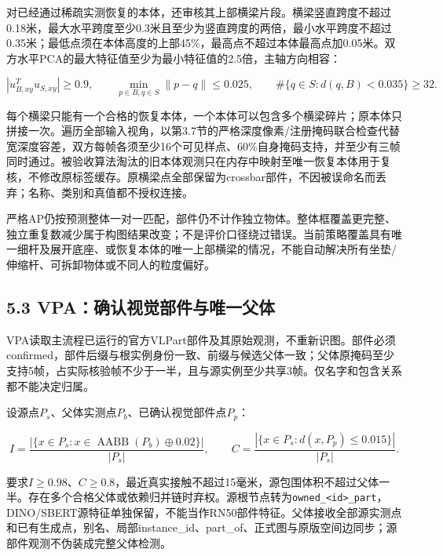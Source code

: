 \documentclass[UTF8,fontset=fandol]{ctexart}
\begin{document}
对已经通过稀疏实测恢复的本体，还审核其上部横梁片段。横梁竖直跨度不超过0.18米，最大水平跨度至少0.3米且至少为竖直跨度的两倍，最小水平跨度不超过0.35米；最低点须在本体高度的上部45\%，最高点不超过本体最高点加0.05米。双方水平PCA的最大特征值至少为最小特征值的2.5倍，主轴方向相容：



\[
|u_{B,xy}^{T}u_{S,xy}|\ge0.9,\qquad
\min_{p\in B,q\in S}\|p-q\|\le0.025,\qquad
\#\{q\in S:d(q,B)<0.035\}\ge32.
\]

每个横梁只能有一个合格的恢复本体，一个本体可以包含多个横梁碎片；原本体只拼接一次。遍历全部输入视角，以第3.7节的严格深度像素/注册掩码联合检查代替宽深度容差，双方每帧各须至少16个可见样点、60\%自身掩码支持，并至少有三帧同时通过。被验收算法淘汰的旧本体观测只在内存中映射至唯一恢复本体用于复核，不修改原标签缓存。原横梁点全部保留为crossbar部件，不因被误命名而丢弃；名称、类别和真值都不授权连接。



严格AP仍按预测整体一对一匹配，部件仍不计作独立物体。整体框覆盖更完整、独立重复数减少属于构图结果改变；不是评价口径绕过错误。当前策略覆盖具有唯一细杆及展开底座、或恢复本体的唯一上部横梁的情况，不能自动解决所有坐垫/伸缩杆、可拆卸物体或不同人的粒度偏好。



\subsection*{5.3 VPA：确认视觉部件与唯一父体}

VPA读取主流程已运行的官方VLPart部件及其原始观测，不重新识图。部件必须confirmed，部件后缀与根实例身份一致、前缀与候选父体一致；父体原掩码至少支持5帧，占实际核验帧不少于一半，且与源实例至少共享3帧。仅名字和包含关系都不能决定归属。



设源点$P_s$、父体实测点$P_b$、已确认视觉部件点$P_p$：



\[
I=\frac{|\{x\in P_s:x\in\operatorname{AABB}(P_b)\oplus0.02\}|}{|P_s|},\qquad
C=\frac{|\{x\in P_s:d(x,P_p)\leq0.015\}|}{|P_s|}.
\]

要求$I\geq0.98$、$C\geq0.8$，最近真实接触不超过15毫米，源包围体积不超过父体一半。存在多个合格父体或依赖归并链时弃权。源根节点转为\texttt{owned\_\allowbreak{}<id>\_\allowbreak{}part}，DINO/SBERT源特征单独保留，不能当作RN50部件特征。父体接收全部源实测点和已有生成点，别名、局部instance\_id、part\_of、正式图与原版空间边同步；源部件观测不伪装成完整父体检测。
\end{document}
